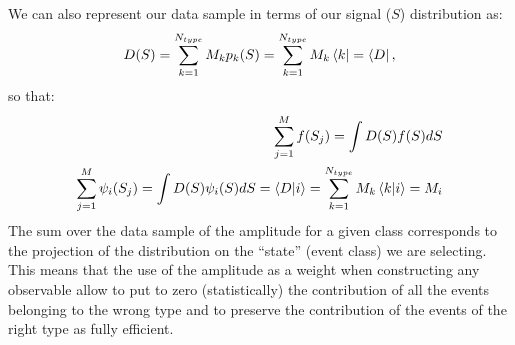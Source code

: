 We can also represent our data sample in terms of our signal ($S$)
distribution as:
\begin{equation}
\label{Sec1:DataSample}
D(S) = \sum\limits_{k=1}^{N_{type}} M_{k} p_{k}(S) = 
\sum\limits_{k=1}^{N_{type}}M_{k}\bra{k} = \bra{D},
\end{equation}
so that:
\begin{eqnarray}
\label{Sec1:Distribution}
\sum\limits_{j=1}^{M} f(S_j) = \int D(S) f(S) dS \\
\sum\limits_{j=1}^{M} \psi_{i}(S_j) = \int D(S) \psi_{i}(S) dS = \braket{D|i} = \sum\limits_{k=1}^{N_{type}}M_{k}\braket{k|i}=M_{i}
\end{eqnarray}
The sum over the data sample of the amplitude for a given class corresponds to
the projection of the distribution on the ``state'' (event class) we are
selecting. This means that the use of the amplitude as a weight when
constructing any observable allow to put to zero (statistically) the contribution of all the
events belonging to the wrong type and to preserve the contribution of the
events of the right type as fully efficient.
